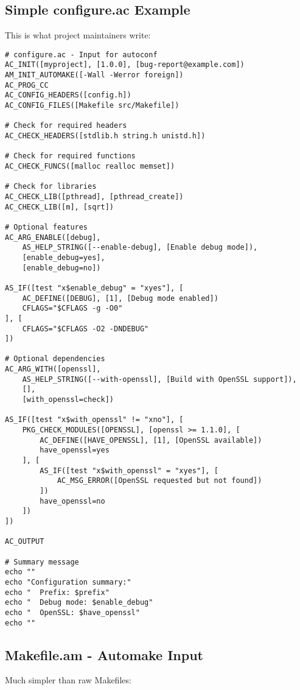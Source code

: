 \subsection{Simple configure.ac Example}

This is what project maintainers write:

\begin{lstlisting}
# configure.ac - Input for autoconf
AC_INIT([myproject], [1.0.0], [bug-report@example.com])
AM_INIT_AUTOMAKE([-Wall -Werror foreign])
AC_PROG_CC
AC_CONFIG_HEADERS([config.h])
AC_CONFIG_FILES([Makefile src/Makefile])

# Check for required headers
AC_CHECK_HEADERS([stdlib.h string.h unistd.h])

# Check for required functions
AC_CHECK_FUNCS([malloc realloc memset])

# Check for libraries
AC_CHECK_LIB([pthread], [pthread_create])
AC_CHECK_LIB([m], [sqrt])

# Optional features
AC_ARG_ENABLE([debug],
    AS_HELP_STRING([--enable-debug], [Enable debug mode]),
    [enable_debug=yes],
    [enable_debug=no])

AS_IF([test "x$enable_debug" = "xyes"], [
    AC_DEFINE([DEBUG], [1], [Debug mode enabled])
    CFLAGS="$CFLAGS -g -O0"
], [
    CFLAGS="$CFLAGS -O2 -DNDEBUG"
])

# Optional dependencies
AC_ARG_WITH([openssl],
    AS_HELP_STRING([--with-openssl], [Build with OpenSSL support]),
    [],
    [with_openssl=check])

AS_IF([test "x$with_openssl" != "xno"], [
    PKG_CHECK_MODULES([OPENSSL], [openssl >= 1.1.0], [
        AC_DEFINE([HAVE_OPENSSL], [1], [OpenSSL available])
        have_openssl=yes
    ], [
        AS_IF([test "x$with_openssl" = "xyes"], [
            AC_MSG_ERROR([OpenSSL requested but not found])
        ])
        have_openssl=no
    ])
])

AC_OUTPUT

# Summary message
echo ""
echo "Configuration summary:"
echo "  Prefix: $prefix"
echo "  Debug mode: $enable_debug"
echo "  OpenSSL: $have_openssl"
echo ""
\end{lstlisting}

\subsection{Makefile.am - Automake Input}

Much simpler than raw Makefiles:

